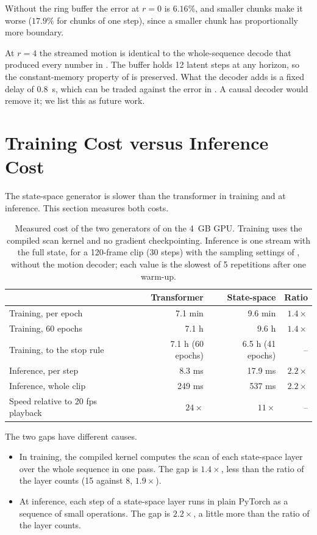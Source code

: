 Without the ring buffer the error at $r = 0$ is $6.16\%$, and smaller chunks make it worse ($17.9\%$ for chunks of one step), since a smaller chunk has proportionally more boundary.

At $r = 4$ the streamed motion is identical to the whole-sequence decode that produced every number in . The buffer holds 12 latent steps at any horizon, so the constant-memory property of  is preserved. What the decoder adds is a fixed delay of $0.8$~s, which can be traded against the error in . A causal decoder would remove it; we list this as future work.

\section{Training Cost versus Inference Cost}
\label{sec:stream_cost}

The state-space generator is slower than the transformer in training and at inference. This section measures both costs.

\begin{table}[H]
\centering
\caption{Measured cost of the two generators of  on the 4~GB GPU. Training uses the compiled scan kernel and no gradient checkpointing. Inference is one stream with the full state, for a 120-frame clip (30 steps) with the sampling settings of , without the motion decoder; each value is the slowest of 5 repetitions after one warm-up.}
\label{tab:cost}
\begin{tabular}{lrrr}
\toprule
 & Transformer & State-space & Ratio \\
\midrule
Training, per epoch & 7.1 min & 9.6 min & $1.4\times$ \\
Training, 60 epochs & 7.1 h & 9.6 h & $1.4\times$ \\
Training, to the stop rule & 7.1 h (60 epochs) & 6.5 h (41 epochs) & -- \\
\midrule
Inference, per step & 8.3 ms & 17.9 ms & $2.2\times$ \\
Inference, whole clip & 249 ms & 537 ms & $2.2\times$ \\
Speed relative to 20 fps playback & $24\times$ & $11\times$ & -- \\
\bottomrule
\end{tabular}
\end{table}

The two gaps have different causes.
\begin{itemize}
\item In training, the compiled kernel computes the scan of each state-space layer over the whole sequence in one pass. The gap is $1.4\times$, less than the ratio of the layer counts (15 against 8, $1.9\times$).
\item At inference, each step of a state-space layer runs in plain PyTorch as a sequence of small operations. The gap is $2.2\times$, a little more than the ratio of the layer counts.
\end{itemize}

